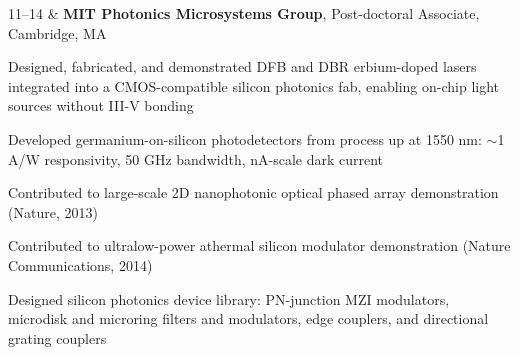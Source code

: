 \begin{resumetabular}
11--14 &
\textbf{MIT Photonics Microsystems Group}, Post-doctoral Associate, Cambridge, MA
\begin{jobitems}
  \item Designed, fabricated, and demonstrated DFB and DBR erbium-doped lasers integrated into a CMOS-compatible silicon photonics fab, enabling on-chip light sources without III-V bonding
  \item Developed germanium-on-silicon photodetectors from process up at 1550 nm: $\sim$1 A/W responsivity, 50 GHz bandwidth, nA-scale dark current
  \item Contributed to large-scale 2D nanophotonic optical phased array demonstration (Nature, 2013)
  \item Contributed to ultralow-power athermal silicon modulator demonstration (Nature Communications, 2014)
  \item Designed silicon photonics device library: PN-junction MZI modulators, microdisk and microring filters and modulators, edge couplers, and directional grating couplers
\end{jobitems}
\end{resumetabular}